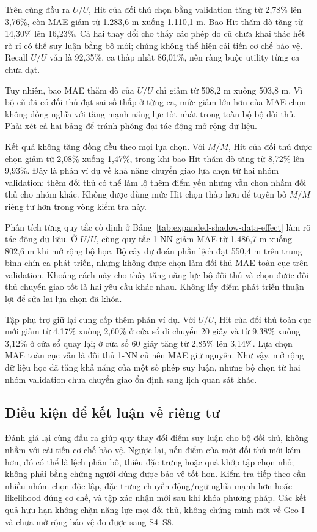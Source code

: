 

Trên cùng đầu ra $U/U$, Hit của đối thủ chọn bằng validation tăng từ 2,78\% lên 3,76\%, còn MAE giảm từ 1.283,6 m xuống 1.110,1 m. Bao Hit thăm dò tăng từ 14,30\% lên 16,23\%. Cả hai thay đổi cho thấy các phép đo cũ chưa khai thác hết rò rỉ có thể suy luận bằng bộ mới; chúng không thể hiện cải tiến cơ chế bảo vệ. Recall $U/U$ vẫn là 92,35\%, ca thấp nhất 86,01\%, nên ràng buộc utility từng ca chưa đạt.

Tuy nhiên, bao MAE thăm dò của $U/U$ chỉ giảm từ 508,2 m xuống 503,8 m. Vì bộ cũ đã có đối thủ đạt sai số thấp ở từng ca, mức giảm lớn hơn của MAE chọn không đồng nghĩa với tăng mạnh năng lực tốt nhất trong toàn bộ bộ đối thủ. Phải xét cả hai bảng để tránh phóng đại tác động mở rộng dữ liệu.

Kết quả không tăng đồng đều theo mọi lựa chọn. Với $M/M$, Hit của đối thủ được chọn giảm từ 2,08\% xuống 1,47\%, trong khi bao Hit thăm dò tăng từ 8,72\% lên 9,93\%. Đây là phản ví dụ về khả năng chuyển giao lựa chọn từ hai nhóm validation: thêm đối thủ có thể làm lộ thêm điểm yếu nhưng vẫn chọn nhầm đối thủ cho nhóm khác. Không được dùng mức Hit chọn thấp hơn để tuyên bố $M/M$ riêng tư hơn trong vòng kiểm tra này.

Phân tích từng quy tắc cố định ở Bảng~\ref{tab:expanded-shadow-data-effect} làm rõ tác động dữ liệu. Ở $U/U$, cùng quy tắc 1-NN giảm MAE từ 1.486,7 m xuống 802,6 m khi mở rộng bộ học. Bộ cây dự đoán phần lệch đạt 550,4 m trên trung bình chín ca phát triển, nhưng không được chọn làm đối thủ MAE toàn cục trên validation. Khoảng cách này cho thấy tăng năng lực bộ đối thủ và chọn được đối thủ chuyển giao tốt là hai yêu cầu khác nhau. Không lấy điểm phát triển thuận lợi để sửa lại lựa chọn đã khóa.

Tập phụ trợ giữ lại cung cấp thêm phản ví dụ. Với $U/U$, Hit của đối thủ toàn cục mới giảm từ 4,17\% xuống 2,60\% ở cửa sổ di chuyển 20 giây và từ 9,38\% xuống 3,12\% ở cửa sổ quay lại; ở cửa sổ 60 giây tăng từ 2,85\% lên 3,14\%. Lựa chọn MAE toàn cục vẫn là đối thủ 1-NN cũ nên MAE giữ nguyên. Như vậy, mở rộng dữ liệu học đã tăng khả năng của một số phép suy luận, nhưng bộ chọn từ hai nhóm validation chưa chuyển giao ổn định sang lịch quan sát khác.

\subsection{Điều kiện để kết luận về riêng tư}

Đánh giá lại cùng đầu ra giúp quy thay đổi điểm suy luận cho bộ đối thủ, không nhầm với cải tiến cơ chế bảo vệ. Ngược lại, nếu điểm của một đối thủ mới kém hơn, đó có thể là lệch phân bố, thiếu đặc trưng hoặc quá khớp tập chọn nhỏ; không phải bằng chứng người dùng được bảo vệ tốt hơn. Kiểm tra tiếp theo cần nhiều nhóm chọn độc lập, đặc trưng chuyển động/ngữ nghĩa mạnh hơn hoặc likelihood đúng cơ chế, và tập xác nhận mới sau khi khóa phương pháp. Các kết quả hữu hạn không chặn năng lực mọi đối thủ, không chứng minh mới về Geo-I và chưa mở rộng bảo vệ đo được sang S4--S8.
\par\endgroup
